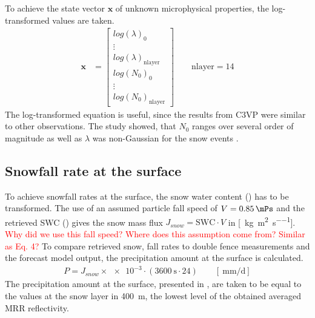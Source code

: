To achieve the state vector $\mathbf{x}$ of unknown microphysical properties, the log-transformed values are taken.
\begin{align}
	\mathbf{x} & = \begin{bmatrix}
		log(\lambda)_0 	\\
		\vdots 			\\
		log(\lambda)_{\text{nlayer}} 	\\
		log(N_0)_0		\\
		\vdots			\\
		log(N_0)_{\text{nlayer}}		
	\end{bmatrix} \qquad \text{nlayer} = 14
	\label{eq:snow_prop}
\end{align}
The log-transformed equation is useful, since the results from C3VP were similar to other observations. The study showed, that $N_0$ ranges over several order of magnitude as well as $\lambda$ was non-Gaussian for the snow events \citet{wood_estimation_2011}.

\subsection{Snowfall rate at the surface}
%
To achieve snowfall rates at the surface, the snow water content () has to be transformed. The use of an assumed particle fall speed of $V = \SI{0.85}{\mPs}$ and the retrieved SWC () gives the snow mass flux $J_{snow} = \text{SWC} \cdot V$ in [\SI{}{\kilogram\per\square\metre\per\second}]. \textcolor{red}{Why did we use this fall speed? Where does this assumption come from? Similar as \citet{cooper_variational_2017} Eq. 4?} 
To compare retrieved snow, fall rates to double fence measurements and the forecast model output, the precipitation amount at the surface is calculated. 
\begin{align}
	P = J_{snow} \times \num{e-3} \cdot \left(\SI{3600}{\second} \cdot24 \right) \qquad [\SI{}{\mm\per\day}]
\end{align}
The precipitation amount at the surface, presented in , are taken to be equal to the values at the snow layer in \SI{400}{\metre}, the lowest level of the obtained averaged MRR reflectivity. 








